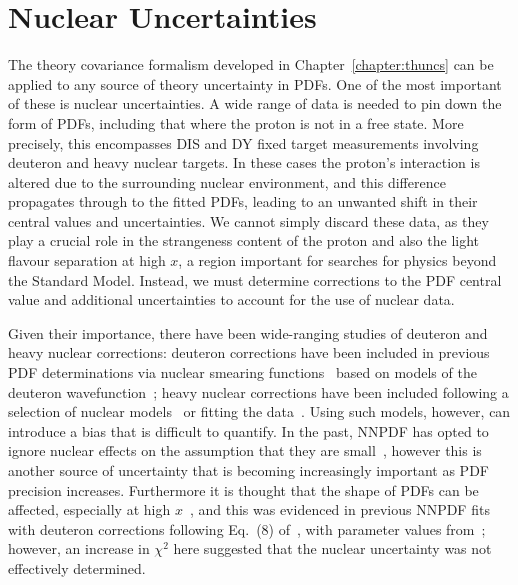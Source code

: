 \label{chapter:nuclear}
\chapter{Nuclear Uncertainties}
The theory covariance formalism developed in Chapter~\ref{chapter:thuncs} can be applied to any source of theory uncertainty in PDFs. One of the most important of these is nuclear uncertainties. A wide range of data is needed to pin down the form of PDFs, including that where the proton is not in a free state. More precisely, this encompasses DIS and DY fixed target measurements involving deuteron and heavy nuclear targets. In these cases the proton's interaction is altered due to the surrounding nuclear environment, and this difference propagates through to the fitted PDFs, leading to an unwanted shift in their central values and uncertainties. We cannot simply discard these data, as they play a crucial role in the strangeness content of the proton and also the light flavour separation at high $x$, a region important for searches for physics beyond the Standard Model. Instead, we must determine corrections to the PDF central value and additional uncertainties to account for the use of nuclear data.

Given their importance, there have been wide-ranging studies of deuteron and heavy nuclear corrections: deuteron corrections have been included in previous PDF determinations via nuclear smearing functions~\cite{Owens:2012bv,Ball:2013gsa,Harland-Lang:2014zoa,Accardi:2016qay,
  Alekhin:2017fpf} based on models of the deuteron wavefunction~\cite{Wiringa:1994wb,Melnitchouk:1994rv,Melnitchouk:1996vp,
  Machleidt:2000ge,Gross:2014wqa}; heavy nuclear corrections have been included following a selection of nuclear models~\cite{Harland-Lang:2014zoa,Dulat:2015mca,Alekhin:2017kpj} or fitting the data~\cite{Accardi:2016qay}. Using such models, however, can introduce a bias that is difficult to quantify. In the past, NNPDF has opted to ignore nuclear effects on the assumption that they are small~\cite{Ball:2013gsa, Ball:2014uwa, Ball:2017nwa}, however this is another source of uncertainty that is becoming increasingly important as PDF precision increases. Furthermore it is thought that the shape of PDFs can be affected, especially at high $x$~\cite{Owens:2012bv}, and this was evidenced in previous NNPDF fits with deuteron corrections following Eq.~(8) of~\cite{Harland-Lang:2014zoa}, with parameter values
from~\cite{Martin:2012da}; however, an increase in $\chi^2$ here suggested that the nuclear uncertainty was not effectively determined.
  
